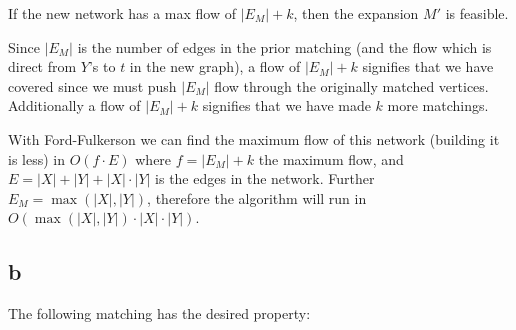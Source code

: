 \documentclass{amsart}
\theoremstyle{definition}
\theoremstyle{remark}
\numberwithin{equation}{section}
\begin{document}
\claimstar If the new network has a max flow of $|E_M|+k$, then the expansion $M'$ is feasible.

\proof Since $|E_M|$ is the number of edges in the prior matching (and the flow which is direct from $Y$'s to $t$ in the new graph), a flow of $|E_M|+k$ signifies that we have covered since we must push $|E_M|$ flow through the originally matched vertices. Additionally a flow of $|E_M|+k$ signifies that we have made $k$ more matchings.

\rmkstar With Ford-Fulkerson we can find the maximum flow of this network (building it is less) in $O(f \cdot E)$ where $f = |E_M| +k$ the  maximum flow, and $ E=|X|+|Y| + |X| \cdot |Y| $ is the edges in the network. Further $E_M = \max(|X|, |Y|)$, therefore the algorithm will run in $O(\max(|X|,|Y|) \cdot |X| \cdot |Y|)$.

\subsection*{b}
The following matching has the desired property:
\begin{center}
\end{center}
\end{document}
